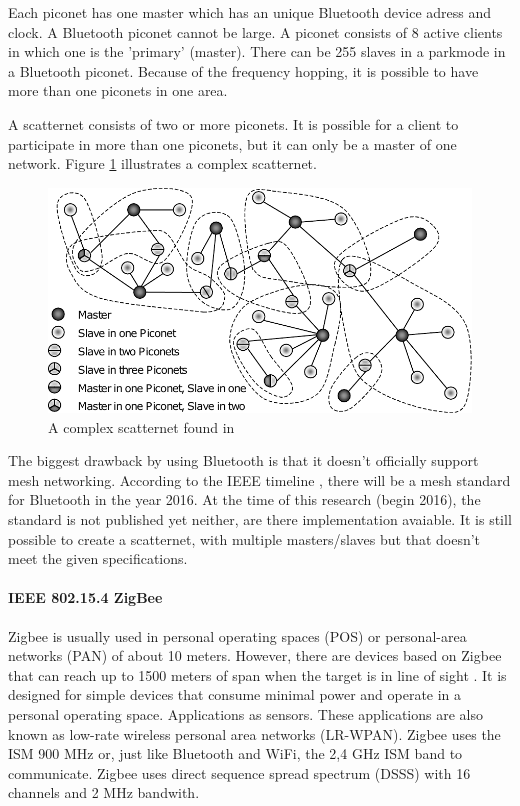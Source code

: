 \documentclass[10pt,a4paper]{article}
\begin{document}
Each piconet has one master which has an unique Bluetooth device adress and clock. A Bluetooth piconet cannot be large. A piconet consists of 8 active clients in which one is the 'primary' (master).\cite{tcipbook} There can be 255 slaves in a parkmode in a Bluetooth piconet. Because of the frequency hopping, it is possible to have more than one piconets in one area. 

A scatternet consists of two or more piconets. It is possible for a client to participate in more than one piconets, but it can only be a master of one network. Figure \ref{fig:scatternet} illustrates a complex scatternet.

\begin{figure}[H]
   \centering
   \includegraphics[width=1\textwidth]{scatternet}
   \caption{A complex scatternet found in \cite{Bluetoothwifisurveyandcomparison}}
   \label{fig:scatternet}
\end{figure}

The biggest drawback by using Bluetooth is that it doesn't officially support mesh networking. According to the IEEE timeline \cite{IEEE80211timeline}, there will be a mesh standard for Bluetooth in the year 2016. \cite{bluetoothmesh} At the time of this research (begin 2016), the standard is not published yet neither, are there implementation avaiable. It is still possible to create a scatternet, with multiple masters/slaves but that doesn't meet the given specifications. \\

\paragraph{IEEE 802.15.4 ZigBee}
Zigbee is usually used in personal operating spaces (POS) or personal-area networks (PAN) of about 10 meters. \cite{combook} However, there are devices based on Zigbee that can reach up to 1500 meters of span when the target is in line of sight \cite{zigbeewiki}. It is designed for simple devices that consume minimal power and operate in a personal operating space. Applications as sensors. These applications are also known as low-rate wireless personal area networks (LR-WPAN). \cite{comparitivestudywirelessprotocols} Zigbee uses the ISM 900 MHz or, just like Bluetooth and WiFi, the 2,4 GHz ISM band to communicate. Zigbee uses direct sequence spread spectrum (DSSS) with 16 channels and 2 MHz bandwith.
\end{document}
